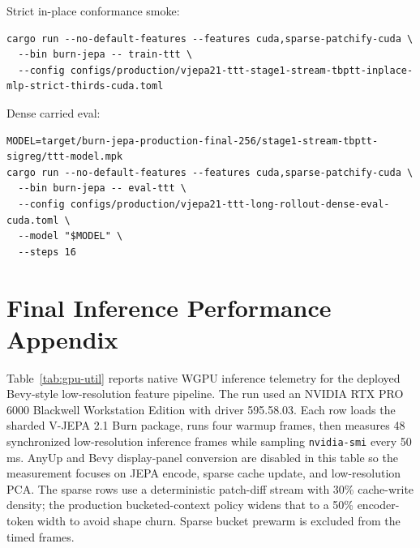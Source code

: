 \documentclass[10pt]{article}
\begin{document}
Strict in-place conformance smoke:
\begin{verbatim}
cargo run --no-default-features --features cuda,sparse-patchify-cuda \
  --bin burn-jepa -- train-ttt \
  --config configs/production/vjepa21-ttt-stage1-stream-tbptt-inplace-mlp-strict-thirds-cuda.toml
\end{verbatim}

Dense carried eval:
\begin{verbatim}
MODEL=target/burn-jepa-production-final-256/stage1-stream-tbptt-sigreg/ttt-model.mpk
cargo run --no-default-features --features cuda,sparse-patchify-cuda \
  --bin burn-jepa -- eval-ttt \
  --config configs/production/vjepa21-ttt-long-rollout-dense-eval-cuda.toml \
  --model "$MODEL" \
  --steps 16
\end{verbatim}

\section{Final Inference Performance Appendix}

Table~\ref{tab:gpu-util} reports native WGPU inference telemetry for the
deployed Bevy-style low-resolution feature pipeline.  The run used an NVIDIA
RTX PRO 6000 Blackwell Workstation Edition with driver 595.58.03.  Each row
loads the sharded V-JEPA 2.1 Burn package, runs four warmup frames, then
measures 48 synchronized low-resolution inference frames while sampling
\texttt{nvidia-smi} every 50 ms.  AnyUp and Bevy display-panel conversion are
disabled in this table so the measurement focuses on JEPA encode, sparse cache
update, and low-resolution PCA.  The sparse rows use a deterministic
patch-diff stream with 30\% cache-write density; the production
bucketed-context policy widens that to a 50\% encoder-token width to avoid
shape churn.  Sparse bucket prewarm is excluded from the timed frames.
\end{document}
